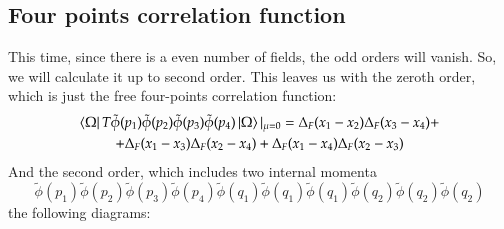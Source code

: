 \documentclass{article}
\begin{document}
\subsection{Four points correlation function}
This time, since there is a even number of fields, the odd orders will vanish. So, we will calculate it up to second order. This leaves us with the zeroth order, which is just the free four-points correlation function:
\begin{equation}
\begin{gathered}
    \bra{\Omega} T \tilde{\phi}(p_1)\tilde{\phi}(p_2)\tilde{\phi}(p_3)\tilde{\phi}(p_4) \ket{\Omega}|_{\mu = 0} = \Delta_F(x_1 - x_2)\Delta_F(x_3 - x_4) + \\ + \Delta_F(x_1 - x_3)\Delta_F(x_2 - x_4) + \Delta_F(x_1 - x_4)\Delta_F(x_2 - x_3)
\end{gathered}
\end{equation}
And the second order, which includes two internal momenta
\begin{equation}
    \tilde{\phi}(p_1)\tilde{\phi}(p_2)\tilde{\phi}(p_3)\tilde{\phi}(p_4)
    \tilde{\phi}(q_1)\tilde{\phi}(q_1)\tilde{\phi}(q_1)
    \tilde{\phi}(q_2)\tilde{\phi}(q_2)\tilde{\phi}(q_2)
\end{equation}
the following diagrams:
\end{document}
